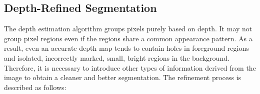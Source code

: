 
%



\subsection{Depth-Refined Segmentation}
\label{sec:algo_drs}


The depth estimation algorithm groups pixels purely based on depth. It may not group pixel regions even if the regions share a common appearance pattern. As a result, even an accurate depth map tends to contain holes in foreground regions and isolated, incorrectly marked, small, bright regions in the background. Therefore, it is necessary to introduce other types of information derived from the image to obtain a cleaner and better segmentation. The refinement process is described as follows:

	\vspace{.5em}

	\vspace{.5em}

